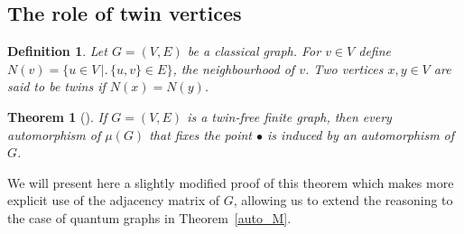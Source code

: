 \documentclass[11pt,reqno]{amsart}
\newtheorem{theorem}[proposition]{Theorem}
\newtheorem{definition}[proposition]{Definition}
\begin{document}
\subsection{The role of twin vertices}\label{subsec:twin}\hspace*{\fill}

\begin{definition}%
Let $G=(V,E)$ be a classical graph. For $v\in V$ define $N(v)=\bigl\{u\in{V}\,\bigr|\bigl.\,\{u,v\}\in{E}\bigr\}$, the neighbourhood of $v$. Two vertices $x,y\in V$ are said to be \emph{twins} if $N(x)=N(y)$.
\end{definition}

\begin{theorem}[{\cite[Proposition 4.1]{Alikhani19}}]\label{thm:main-class}
If $G=(V,E)$ is a twin-free finite graph, then every automorphism of $\mu(G)$ that fixes the point $\bullet$ is induced by an automorphism of $G$.
\end{theorem}

We will present here a slightly modified proof of this theorem which makes more explicit use of the adjacency matrix of $G$, allowing us to extend the reasoning to the case of quantum graphs in Theorem~\ref{auto_M}.
\end{document}
